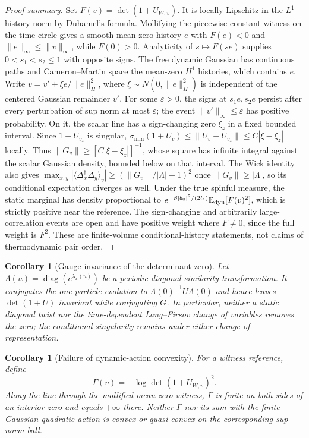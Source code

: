 \documentclass[11pt]{article}
\newtheorem{corollary}[theorem]{Corollary}
\theoremstyle{definition}
\theoremstyle{remark}
\DeclareMathOperator{\diag}{diag}
\newcommand{\E}{\mathbb{E}}
\begin{document}
\begin{proof}[Proof summary]
Set $F(v)=\det(1+U_{W,v})$. It is locally Lipschitz in the $L^1$ history norm by Duhamel's formula. Mollifying the piecewise-constant witness on the time circle gives a smooth mean-zero history $e$ with $F(e)<0$ and $\|e\|_\infty\leq\|v\|_\infty$, while $F(0)>0$. Analyticity of $s\mapsto F(se)$ supplies $0<s_1<s_2\leq1$ with opposite signs.
The free dynamic Gaussian has continuous paths and Cameron--Martin space the mean-zero $H^1$ histories, which contains $e$. Write $v=v'+\xi e/\|e\|_H^2$, where $\xi\sim N(0,\|e\|_H^2)$ is independent of the centered Gaussian remainder $v'$. For some $\varepsilon>0$, the signs at $s_1e,s_2e$ persist after every perturbation of sup norm at most $\varepsilon$; the event $\|v'\|_\infty\leq\varepsilon$ has positive probability. On it, the scalar line has a sign-changing zero $\xi_z$ in a fixed bounded interval. Since $1+U_{v_z}$ is singular, $\sigma_{\min}(1+U_v)\leq\|U_v-U_{v_z}\|\leq C|\xi-\xi_z|$ locally. Thus $\|G_v\|\geq[C|\xi-\xi_z|]^{-1}$, whose square has infinite integral against the scalar Gaussian density, bounded below on that interval.
The Wick identity also gives $\max_{x,y}|\langle\Delta_x^\dagger\Delta_y\rangle_v|\geq(\|G_v\|/|\Lambda|-1)^2$ once $\|G_v\|\geq|\Lambda|$, so its conditional expectation diverges as well. Under the true spinful measure, the static marginal has density proportional to $e^{-\beta|b_0|^2/(2U)}\E_{\rm dyn}[F(v)^2]$, which is strictly positive near the reference. The sign-changing and arbitrarily large-correlation events are open and have positive weight where $F\ne0$, since the full weight is $F^2$. These are finite-volume conditional-history statements, not claims of thermodynamic pair order.
\end{proof}

\begin{corollary}[Gauge invariance of the determinant zero]\label{cor:gauge}
Let $\Lambda(u)=\diag(e^{\lambda_x(u)})$ be a periodic diagonal similarity transformation. It conjugates the one-particle evolution to $\Lambda(0)^{-1}U\Lambda(0)$ and hence leaves $\det(1+U)$ invariant while conjugating $G$. In particular, neither a static diagonal twist nor the time-dependent Lang--Firsov change of variables removes the zero; the conditional singularity remains under either change of representation.
\end{corollary}

\begin{corollary}[Failure of dynamic-action convexity]\label{cor:convex}
For a witness reference, define
\[
 \Gamma(v)=-\log\det(1+U_{W,v})^2.
\]
Along the line through the mollified mean-zero witness, $\Gamma$ is finite on both sides of an interior zero and equals $+\infty$ there. Neither $\Gamma$ nor its sum with the finite Gaussian quadratic action is convex or quasi-convex on the corresponding sup-norm ball.
\end{corollary}
\end{document}
